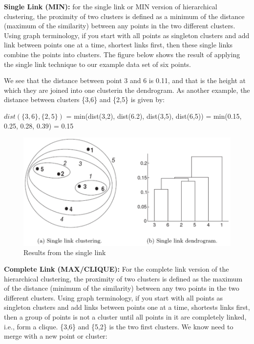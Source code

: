 		{\bf Single Link (MIN):} for the single link or MIN version of hierarchical clustering, 
		the proximity of two clusters is defined as a minimum of the distance (maximum of the 
		similarity) between any points in the two different clusters. Using graph terminology, 
		if you start with all points as singleton clusters and add link between points one at 
		a time, shortest links first, then these single links combine the points into clusters. 
		The figure below shows the result of applying the single link technique to our example
		data set of six points.

		We see that the distance between point 3 and 6 is 0.11, and that is the height at which they
		are joined into one clusterin the dendrogram. As another example, the distance between
		clusters \{3,6\} and \{2,5\} is given by:

		{\color{red} $dist(\{3,6\}, \{2,5\})$ = min(dist(3,2), dist(6.2), dist(3,5), dist(6,5))
		= min(0.15, 0.25, 0.28, 0.39) = 0.15}


			\begin{figure}[H]
				\centering
				\includegraphics[scale=0.3]{pics/minlink.png}
				\caption{Results from the single link}
			\end{figure}			
		\clearpage
		{\bf Complete Link (MAX/CLIQUE):} For the complete link version of the  hierarchical clustering,
		the proximity of two clusters is defined as the maximum of the distance  (minimum of the 
		similarity) between any two points in the two different clusters. Using graph terminology,
		if you start with all points as singleton clusters and add links between points one at a time,
		shortests links first, then a group of points is not a cluster until all points in it are 
		completely linked, i.e., form a clique. 
		\{3,6\} and \{5,2\} is the two first clusters. We know need to merge with a new point or cluster:

